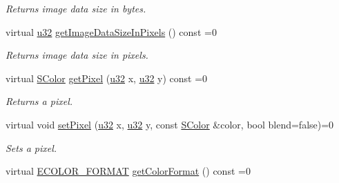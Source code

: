 \begin{DoxyCompactItemize}
\begin{DoxyCompactList}\small\item\em Returns image data size in bytes. \end{DoxyCompactList}\item 
virtual \hyperlink{namespaceirr_a0416a53257075833e7002efd0a18e804}{u32} \hyperlink{classirr_1_1video_1_1IImage_a8c348f459af5323559b81ac4d3a5c3d8}{get\+Image\+Data\+Size\+In\+Pixels} () const  =0\hypertarget{classirr_1_1video_1_1IImage_a8c348f459af5323559b81ac4d3a5c3d8}{}\label{classirr_1_1video_1_1IImage_a8c348f459af5323559b81ac4d3a5c3d8}

\begin{DoxyCompactList}\small\item\em Returns image data size in pixels. \end{DoxyCompactList}\item 
virtual \hyperlink{classirr_1_1video_1_1SColor}{S\+Color} \hyperlink{classirr_1_1video_1_1IImage_abd1ee6c06af158c36245803b57bbff01}{get\+Pixel} (\hyperlink{namespaceirr_a0416a53257075833e7002efd0a18e804}{u32} x, \hyperlink{namespaceirr_a0416a53257075833e7002efd0a18e804}{u32} y) const  =0\hypertarget{classirr_1_1video_1_1IImage_abd1ee6c06af158c36245803b57bbff01}{}\label{classirr_1_1video_1_1IImage_abd1ee6c06af158c36245803b57bbff01}

\begin{DoxyCompactList}\small\item\em Returns a pixel. \end{DoxyCompactList}\item 
virtual void \hyperlink{classirr_1_1video_1_1IImage_a89bf6020ce6ac1066e4d585ce46f79bd}{set\+Pixel} (\hyperlink{namespaceirr_a0416a53257075833e7002efd0a18e804}{u32} x, \hyperlink{namespaceirr_a0416a53257075833e7002efd0a18e804}{u32} y, const \hyperlink{classirr_1_1video_1_1SColor}{S\+Color} \&color, bool blend=false)=0\hypertarget{classirr_1_1video_1_1IImage_a89bf6020ce6ac1066e4d585ce46f79bd}{}\label{classirr_1_1video_1_1IImage_a89bf6020ce6ac1066e4d585ce46f79bd}

\begin{DoxyCompactList}\small\item\em Sets a pixel. \end{DoxyCompactList}\item 
virtual \hyperlink{namespaceirr_1_1video_a1d5e487888c32b1674a8f75116d829ed}{E\+C\+O\+L\+O\+R\+\_\+\+F\+O\+R\+M\+AT} \hyperlink{classirr_1_1video_1_1IImage_a36bac90ac99f8de86fae8b38144171cf}{get\+Color\+Format} () const  =0\hypertarget{classirr_1_1video_1_1IImage_a36bac90ac99f8de86fae8b38144171cf}{}\label{classirr_1_1video_1_1IImage_a36bac90ac99f8de86fae8b38144171cf}


\end{DoxyCompactItemize}
